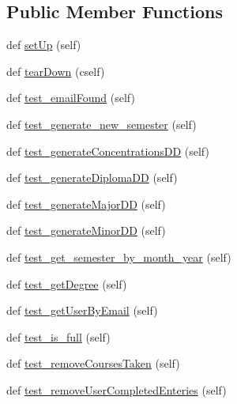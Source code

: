 \subsection*{Public Member Functions}
\begin{DoxyCompactItemize}
\item 
def \mbox{\hyperlink{classmavAgenda_1_1landing_1_1tests_1_1test__logic_1_1YourTestClass_a52341724cc7e7454dc9c3d7b9a3cb9b4}{set\+Up}} (self)
\item 
def \mbox{\hyperlink{classmavAgenda_1_1landing_1_1tests_1_1test__logic_1_1YourTestClass_ac06b5ac32b334c6db8d20b28bff9dcd5}{tear\+Down}} (cself)
\item 
def \mbox{\hyperlink{classmavAgenda_1_1landing_1_1tests_1_1test__logic_1_1YourTestClass_ab211b3198abbb55213fbd449749cd7eb}{test\+\_\+email\+Found}} (self)
\item 
def \mbox{\hyperlink{classmavAgenda_1_1landing_1_1tests_1_1test__logic_1_1YourTestClass_ae13fb320de9f7b8e11a657713ed28e3b}{test\+\_\+generate\+\_\+new\+\_\+semester}} (self)
\item 
def \mbox{\hyperlink{classmavAgenda_1_1landing_1_1tests_1_1test__logic_1_1YourTestClass_a92dd9e0d0f4c7721cc16cf6ad318e20c}{test\+\_\+generate\+Concentrations\+DD}} (self)
\item 
def \mbox{\hyperlink{classmavAgenda_1_1landing_1_1tests_1_1test__logic_1_1YourTestClass_adcb1fa2a84938fbda1e95945e5fe7563}{test\+\_\+generate\+Diploma\+DD}} (self)
\item 
def \mbox{\hyperlink{classmavAgenda_1_1landing_1_1tests_1_1test__logic_1_1YourTestClass_a96eb626f5ff67d3bef7e4d6705937fd3}{test\+\_\+generate\+Major\+DD}} (self)
\item 
def \mbox{\hyperlink{classmavAgenda_1_1landing_1_1tests_1_1test__logic_1_1YourTestClass_a1cb83153767db996e15d9db71338a0af}{test\+\_\+generate\+Minor\+DD}} (self)
\item 
def \mbox{\hyperlink{classmavAgenda_1_1landing_1_1tests_1_1test__logic_1_1YourTestClass_a919098d14fd2ebdf36ebb1bcab559df9}{test\+\_\+get\+\_\+semester\+\_\+by\+\_\+month\+\_\+year}} (self)
\item 
def \mbox{\hyperlink{classmavAgenda_1_1landing_1_1tests_1_1test__logic_1_1YourTestClass_a1027711c315b11bdb28b362052f7899c}{test\+\_\+get\+Degree}} (self)
\item 
def \mbox{\hyperlink{classmavAgenda_1_1landing_1_1tests_1_1test__logic_1_1YourTestClass_a350891680934199ae19c4dd9c17c2bc6}{test\+\_\+get\+User\+By\+Email}} (self)
\item 
def \mbox{\hyperlink{classmavAgenda_1_1landing_1_1tests_1_1test__logic_1_1YourTestClass_aea8bc5604b3cad518ccb0a9a401a9531}{test\+\_\+is\+\_\+full}} (self)
\item 
def \mbox{\hyperlink{classmavAgenda_1_1landing_1_1tests_1_1test__logic_1_1YourTestClass_ade83dd9818234e7d8dfd23641c23b012}{test\+\_\+remove\+Courses\+Taken}} (self)
\item 
def \mbox{\hyperlink{classmavAgenda_1_1landing_1_1tests_1_1test__logic_1_1YourTestClass_a2b1231c90d1e9b656ffd68eae5cc140a}{test\+\_\+remove\+User\+Completed\+Enteries}} (self)
\end{DoxyCompactItemize}


